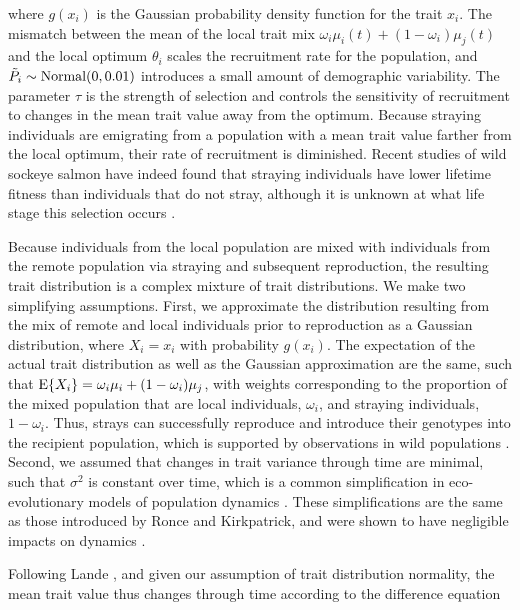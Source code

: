 \documentclass{revtex4}
\begin{document}
\noindent where $g(x_i)$ is the Gaussian probability density function for the trait $x_i$. The mismatch between the mean of the local trait mix $\omega_i\mu_i(t) + (1-\omega_i)\mu_j(t)$ and the local optimum $\theta_i$ scales the recruitment rate for the population, and $\tilde{P}_i\sim {\rm Normal}(0,0.01)$ introduces a small amount of demographic variability.
The parameter $\tau$ is the strength of selection and controls the sensitivity of recruitment to changes in the mean trait value away from the optimum.
Because straying individuals are emigrating from a population with a mean trait value farther from the local optimum, their rate of recruitment is diminished.
Recent studies of wild sockeye salmon have indeed found that straying individuals have lower lifetime fitness than individuals that do not stray, although it is unknown at what life stage this selection occurs \citep{Peterson:2014gy}.


Because individuals from the local population are mixed with individuals from the remote population via straying and subsequent reproduction, the resulting trait distribution is a complex mixture of trait distributions.
We make two simplifying assumptions.
First, we approximate the distribution resulting from the mix of remote and local individuals prior to reproduction as a Gaussian distribution, where $X_i=x_i$ with probability $g(x_i)$.
The expectation of the actual trait distribution as well as the Gaussian approximation are the same, such that ${\rm E}\{X_i\} = \omega_i\mu_i + (1-\omega_i)\mu_j$, with weights corresponding to the proportion of the mixed population that are local individuals, $\omega_i$, and straying individuals, $1-\omega_i$.
Thus, strays can successfully reproduce and introduce their genotypes into the recipient population, which is supported by observations in wild populations \citep{Jasper:2013cc}.
Second, we assumed that changes in trait variance through time are minimal, such that $\sigma^2$ is constant over time, which is a common simplification in eco-evolutionary models of population dynamics \citep{Lande:1976ga,Ronce:2001dp,Schreiber:2011wx,Gilbert:2014ee,Gibert:2015kc}.
These simplifications are the same as those introduced by Ronce and Kirkpatrick, and were shown to have negligible impacts on dynamics \citep{Ronce:2001dp}.



Following Lande \citep{Lande:1976ga}, and given our assumption of trait distribution normality, the mean trait value thus changes through time according to the difference equation
\end{document}
